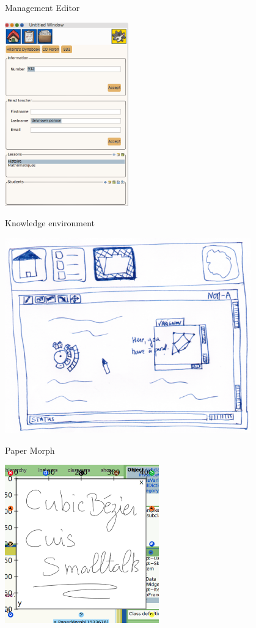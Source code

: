 \documentclass{beamer}
\begin{document}
%
\begin{frame}{Management Editor}
\begin{center}
  \includegraphics[width=0.4\textwidth]{prefEditor.png}
\end{center}
\end{frame}
%
\begin{frame}{Knowledge environment}
\begin{center}
  \includegraphics[width=0.8\textwidth]{image3.png}
\end{center}
\end{frame}
%
\begin{frame}{Paper Morph}
\begin{center}
  \includegraphics[width=0.5\textwidth]{image8.png}
\end{center}
\end{frame}
\end{document}
